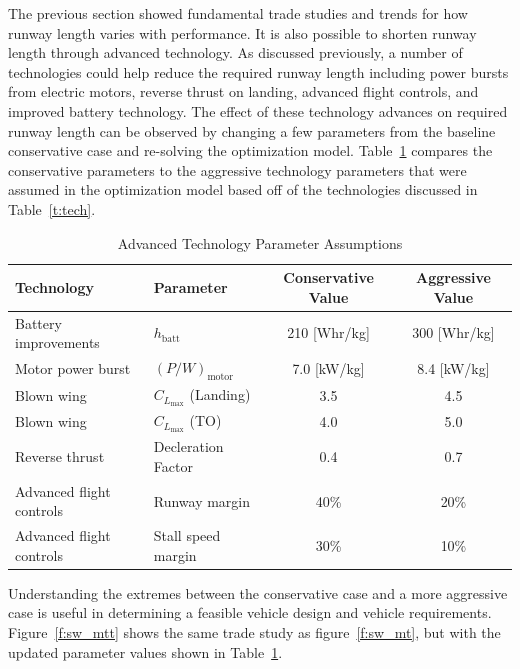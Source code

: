 \documentclass[]{aiaa-tc}%
\begin{document}
The previous section showed fundamental trade studies and trends for how runway length varies with performance.  
It is also possible to shorten runway length through advanced technology. 
As discussed previously, a number of technologies could help reduce the required runway length including power bursts from electric motors, reverse thrust on landing, advanced flight controls, and improved battery technology.  
The effect of these technology advances on required runway length can be observed by changing a few parameters from the baseline conservative case and re-solving the optimization model.
Table~\ref{t:techparams} compares the conservative parameters to the aggressive technology parameters that were assumed in the optimization model based off of the technologies discussed in Table~\ref{t:tech}. 

\begin{table}[H]
    \centering
    \caption{Advanced Technology Parameter Assumptions}
    \label{t:techparams}
    \begin{tabular}{l l c c}
    \toprule
    \toprule
    Technology                  & Parameter                         & Conservative Value  & Aggressive Value \\ \hline
    Battery improvements        & $h_{\mathrm{batt}}$               & 210 [Whr/kg]        & 300 [Whr/kg]\cite{battery_estimates}     \\
    Motor power burst           & $(P/W)_{\mathrm{motor}}$          & 7.0 [kW/kg]       & 8.4 [kW/kg]     \\
    Blown wing                  & $C_{L_{\mathrm{max}}}$ (Landing)  & 3.5                 & 4.5              \\
    Blown wing                  & $C_{L_{\mathrm{max}}}$ (TO)       & 4.0                 & 5.0              \\
    Reverse thrust              & Decleration Factor                & 0.4                 & 0.7              \\
    Advanced flight controls    & Runway margin                     & 40\%                & 20\%             \\
    Advanced flight controls    & Stall speed margin                & 30\%                & 10\%             \\
    \bottomrule
\end{tabular}
\end{table}

Understanding the extremes between the conservative case and a more aggressive case is useful in determining a feasible vehicle design and vehicle requirements. 
Figure~\ref{f:sw_mtt} shows the same trade study as figure~\ref{f:sw_mt}, but with the updated parameter values shown in Table~\ref{t:techparams}.
\end{document}
